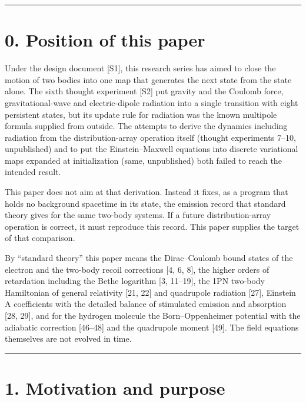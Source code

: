 \documentclass[
  a4paper,
]{article}
\begin{document}
\begin{center}\rule{0.5\linewidth}{0.5pt}\end{center}

\section{0. Position of this paper}\label{position-of-this-paper}

Under the design document {[}S1{]}, this research series has aimed to
close the motion of two bodies into one map that generates the next
state from the state alone. The sixth thought experiment {[}S2{]} put
gravity and the Coulomb force, gravitational-wave and electric-dipole
radiation into a single transition with eight persistent states, but its
update rule for radiation was the known multipole formula supplied from
outside. The attempts to derive the dynamics including radiation from
the distribution-array operation itself (thought experiments 7--10,
unpublished) and to put the Einstein--Maxwell equations into discrete
variational maps expanded at initialization (same, unpublished) both
failed to reach the intended result.

This paper does not aim at that derivation. Instead it fixes, as a
program that holds no background spacetime in its state, the emission
record that standard theory gives for the same two-body systems. If a
future distribution-array operation is correct, it must reproduce this
record. This paper supplies the target of that comparison.

By ``standard theory'' this paper means the Dirac--Coulomb bound states
of the electron and the two-body recoil corrections {[}4, 6, 8{]}, the
higher orders of retardation including the Bethe logarithm {[}3,
11--19{]}, the 1PN two-body Hamiltonian of general relativity {[}21,
22{]} and quadrupole radiation {[}27{]}, Einstein A coefficients with
the detailed balance of stimulated emission and absorption {[}28, 29{]},
and for the hydrogen molecule the Born--Oppenheimer potential with the
adiabatic correction {[}46--48{]} and the quadrupole moment {[}49{]}.
The field equations themselves are not evolved in time.

\begin{center}\rule{0.5\linewidth}{0.5pt}\end{center}

\section{1. Motivation and purpose}\label{motivation-and-purpose}
\end{document}
